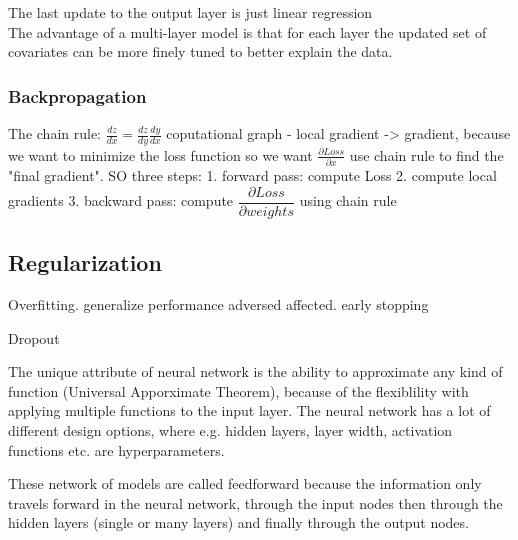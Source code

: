 The last update to the output layer is just linear regression\\
The advantage of a multi-layer model is that for each layer the updated set of covariates can be more finely tuned to better explain the data. 

\subsubsection{Backpropagation}
The chain rule: $\frac{dz}{dx}= \frac{dz}{dy} \frac{dy}{dx}$
coputational graph - local gradient -> gradient, because we want to minimize the loss function
so we want $\frac{\partial Loss}{\partial x}$ use chain rule to find the "final gradient".
SO three steps:
1. forward pass: compute Loss
2. compute local gradients
3. backward pass: compute $\dfrac{\partial Loss}{\partial weights}$ using chain rule

\subsection{Regularization}
Overfitting. generalize performance adversed affected.
early stopping

Dropout


The unique attribute of neural network is the ability to approximate any kind of function (Universal Apporximate Theorem), because of the flexiblility with applying multiple functions to the input layer. The neural network has a lot of different design options, where e.g. hidden layers, layer width, activation functions etc. are hyperparameters.



These network of models are called feedforward because the information only travels forward in the neural network, through the input nodes then through the hidden layers (single or many layers) and finally through the output nodes. 


